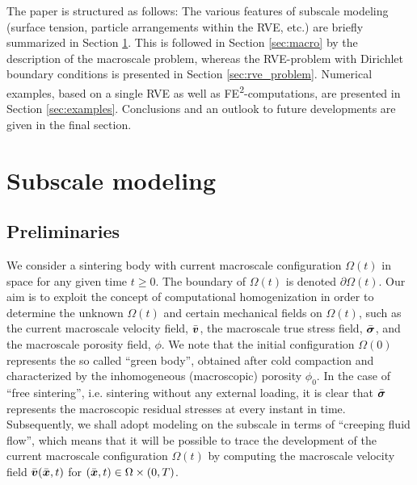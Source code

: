 \documentclass[10pt,a4paper]{article}
\begin{document}
The paper is structured as follows:
The various features of subscale modeling (surface tension, particle arrangements within the RVE, etc.) are briefly summarized in Section \ref{sec:subscale}. This is followed in Section \ref{sec:macro} by the description of the macroscale problem, whereas the RVE-problem with Dirichlet boundary conditions is presented in Section \ref{sec:rve_problem}. Numerical examples, based on a single RVE as well as FE\textsuperscript{2}-computations, are presented in Section \ref{sec:examples}. Conclusions and an outlook to future developments are given in the final section.


\section{Subscale modeling}\label{sec:subscale}

\subsection{Preliminaries}

We consider a sintering body with current macroscale configuration $\Omega(t)$ in space for any given time $t\geq 0$. The boundary of $\Omega(t)$ is denoted $\partial\Omega(t)$. Our aim is to exploit the concept of computational homogenization in order to determine the unknown $\Omega(t)$ and certain mechanical fields on $\Omega(t)$, such as the current macroscale velocity field, $\bar{\boldsymbol{v}}$, the macroscale true stress field, $\bar{\boldsymbol{\sigma}}$, and the macroscale porosity field, $\phi$. We note that the initial configuration $\Omega(0)$ represents the so called ``green body'', obtained after cold compaction and characterized by the inhomogeneous (macroscopic) porosity $\phi_0$. In the case of ``free sintering'', i.e. sintering without any external loading, it is clear that $\bar{\boldsymbol{\sigma}}$ represents the macroscopic residual stresses at every instant in time. Subsequently, we shall adopt modeling on the subscale in terms of ``creeping fluid flow'', which means that it will be possible to trace the development of the current macroscale configuration $\Omega(t)$ by computing  the macroscale velocity field $\bar{\boldsymbol{v}}(\bar{\boldsymbol{x}},t)$ for $(\bar{\boldsymbol{x}},t)\in\Omega\times(0,T)$.
\end{document}
